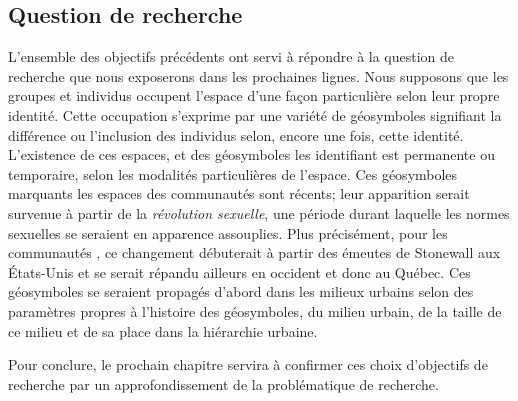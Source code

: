 \subsection*{Question de recherche} %
\label{sub:hypothese}
L'ensemble des objectifs précédents ont servi à répondre à la question de recherche que nous exposerons dans les prochaines lignes.
Nous supposons que les groupes et individus \lgbt{} occupent l'espace d'une façon particulière selon leur propre identité.
Cette occupation s'exprime par une variété de géosymboles signifiant la différence ou l'inclusion des individus selon, encore une fois, cette identité.
L'existence de ces espaces, et des géosymboles les identifiant est permanente ou temporaire, selon les modalités particulières de l'espace.
Ces géosymboles marquants les espaces des communautés \lgbt sont récents; leur apparition serait survenue à partir de la \emph{révolution sexuelle}, une période durant laquelle les normes sexuelles se seraient en apparence assouplies.
Plus précisément, pour les communautés \lgbt{}, ce changement débuterait à partir des émeutes de Stonewall aux États-Unis et se serait répandu ailleurs en occident et donc au Québec.
Ces géosymboles se seraient propagés d'abord dans les milieux urbains selon des paramètres propres à l'histoire des géosymboles, du milieu urbain, de la taille de ce milieu et de sa place dans la hiérarchie urbaine.

Pour conclure, le prochain chapitre servira à confirmer ces choix d'objectifs de recherche par un approfondissement de la problématique de recherche.

